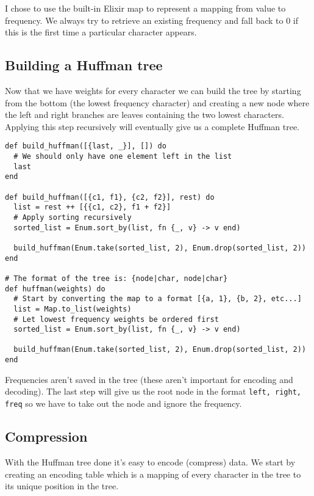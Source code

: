 \documentclass[a4paper,11pt]{article}
\begin{document}
I chose to use the built-in Elixir map to represent a mapping from value to frequency.
We always try to retrieve an existing frequency and fall back to 0 if this is the first time a particular character appears.

\subsection*{Building a Huffman tree}

Now that we have weights for every character we can build the tree by starting from the bottom (the lowest frequency character)
and creating a new node where the left and right branches are leaves containing the two lowest characters.
Applying this step recursively will eventually give us a complete Huffman tree.

\begin{verbatim}
def build_huffman([{last, _}], []) do
  # We should only have one element left in the list
  last
end

def build_huffman([{c1, f1}, {c2, f2}], rest) do
  list = rest ++ [{{c1, c2}, f1 + f2}]
  # Apply sorting recursively
  sorted_list = Enum.sort_by(list, fn {_, v} -> v end)

  build_huffman(Enum.take(sorted_list, 2), Enum.drop(sorted_list, 2))
end

# The format of the tree is: {node|char, node|char}
def huffman(weights) do
  # Start by converting the map to a format [{a, 1}, {b, 2}, etc...]
  list = Map.to_list(weights)
  # Let lowest frequency weights be ordered first
  sorted_list = Enum.sort_by(list, fn {_, v} -> v end)

  build_huffman(Enum.take(sorted_list, 2), Enum.drop(sorted_list, 2))
end
\end{verbatim}

Frequencies aren't saved in the tree (these aren't important for encoding and decoding).
The last step will give us the root node in the format \texttt{{{left, right}, freq}} so we have to take out the node and ignore the frequency.

\subsection*{Compression}

With the Huffman tree done it's easy to encode (compress) data.
We start by creating an encoding table which is a mapping of every character in the tree to its unique position in the tree.
\end{document}
